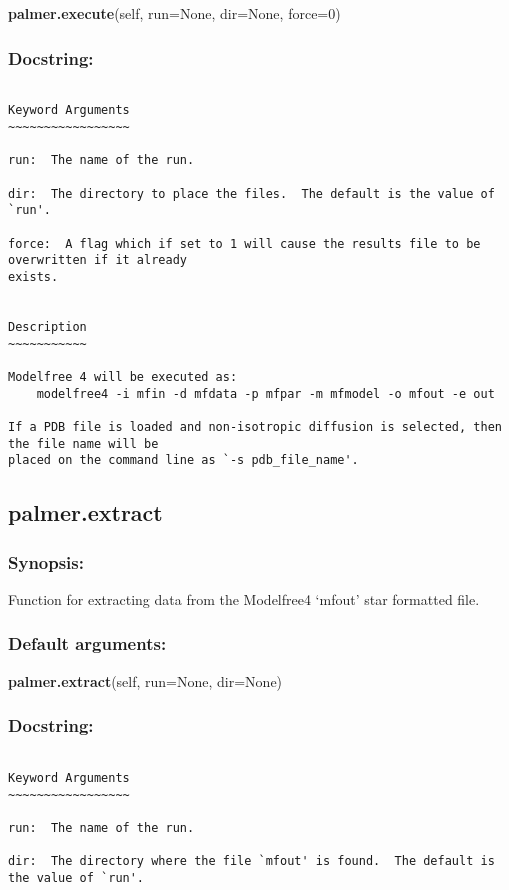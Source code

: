 \textsf{\textbf{palmer.execute}(self, run=None, dir=None, force=0)
}


\subsubsection{Docstring:}

{\scriptsize
\begin{verbatim}

Keyword Arguments
~~~~~~~~~~~~~~~~~

run:  The name of the run.

dir:  The directory to place the files.  The default is the value of `run'.

force:  A flag which if set to 1 will cause the results file to be overwritten if it already
exists.


Description
~~~~~~~~~~~

Modelfree 4 will be executed as:
    modelfree4 -i mfin -d mfdata -p mfpar -m mfmodel -o mfout -e out

If a PDB file is loaded and non-isotropic diffusion is selected, then the file name will be
placed on the command line as `-s pdb_file_name'.
\end{verbatim}
}



\newpage

\subsection{palmer.extract}


\subsubsection{Synopsis:}

Function for extracting data from the Modelfree4 `mfout' star formatted file.

\subsubsection{Default arguments:}

\textsf{\textbf{palmer.extract}(self, run=None, dir=None)
}


\subsubsection{Docstring:}

{\scriptsize
\begin{verbatim}

Keyword Arguments
~~~~~~~~~~~~~~~~~

run:  The name of the run.

dir:  The directory where the file `mfout' is found.  The default is the value of `run'.
\end{verbatim}
}



